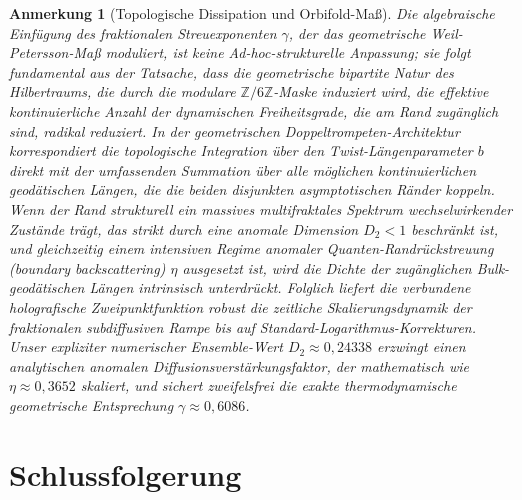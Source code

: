 \documentclass[aps,prl,preprint,superscriptaddress,floatfix]{revtex4-2}
\newtheorem{remark}[theorem]{Anmerkung}
\newcommand{\Zmod}{\mathbb{Z}/6\mathbb{Z}}
\begin{document}
\begin{remark}[Topologische Dissipation und Orbifold-Maß]
Die algebraische Einfügung des fraktionalen Streuexponenten $\gamma$, der das geometrische Weil-Petersson-Maß moduliert, ist keine Ad-hoc-strukturelle Anpassung; sie folgt fundamental aus der Tatsache, dass die geometrische bipartite Natur des Hilbertraums, die durch die modulare $\Zmod$-Maske induziert wird, die effektive kontinuierliche Anzahl der dynamischen Freiheitsgrade, die am Rand zugänglich sind, radikal reduziert.
In der geometrischen Doppeltrompeten-Architektur korrespondiert die topologische Integration über den Twist-Längenparameter $b$ direkt mit der umfassenden Summation über alle möglichen kontinuierlichen geodätischen Längen, die die beiden disjunkten asymptotischen Ränder koppeln.
Wenn der Rand strukturell ein massives multifraktales Spektrum wechselwirkender Zustände trägt, das strikt durch eine anomale Dimension $D_2<1$ beschränkt ist, und gleichzeitig einem intensiven Regime anomaler Quanten-Randrückstreuung (\textit{boundary backscattering}) $\eta$ ausgesetzt ist, wird die Dichte der zugänglichen Bulk-geodätischen Längen intrinsisch unterdrückt.
Folglich liefert die verbundene holografische Zweipunktfunktion robust die zeitliche Skalierungsdynamik der fraktionalen subdiffusiven Rampe bis auf Standard-Logarithmus-Korrekturen.
Unser expliziter numerischer Ensemble-Wert $D_2\approx 0,24338$ erzwingt einen analytischen anomalen Diffusionsverstärkungsfaktor, der mathematisch wie $\eta \approx 0,3652$ skaliert, und sichert zweifelsfrei die exakte thermodynamische geometrische Entsprechung $\gamma \approx 0,6086$.
\end{remark}

\section{Schlussfolgerung}
\end{document}
